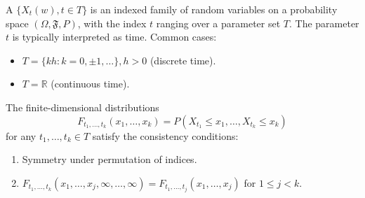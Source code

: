 A  $\{X_t(w), t \in T\}$ is an indexed family of random variables on a probability space $(\Omega, \mathfrak{F}, P)$, with the index $t$ ranging over a parameter set $T$. The parameter $t$ is typically interpreted as time. Common cases:
\begin{itemize}
\item $T = \{k h : k = 0, \pm 1, \ldots\}, h > 0$ (discrete time).
\item $T = \mathbb{R}$ (continuous time).
\end{itemize}

The finite-dimensional distributions
$$F_{t_1, \ldots, t_k}(x_1, \ldots, x_k) = P(X_{t_1} \leq x_1, \ldots, X_{t_k} \leq x_k)$$
for any $t_1, \ldots, t_k \in T$ satisfy the consistency conditions:
\begin{enumerate}
\item Symmetry under permutation of indices.
\item $F_{t_1, \ldots, t_k}(x_1, \ldots, x_j, \infty, \ldots, \infty) = F_{t_1, \ldots, t_j}(x_1, \ldots, x_j)$ for $1 \leq j < k$.
\end{enumerate}
